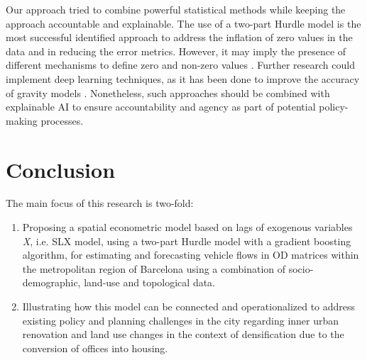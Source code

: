 Our approach tried to combine powerful statistical methods while keeping the approach accountable and explainable. 
The use of a two-part Hurdle model is the most successful identified approach to address the inflation of zero values in the data and in reducing the error metrics. However, it may imply the presence of different mechanisms to define zero and non-zero values \citep{Cameron2013RegressionData}. 
Further research could implement deep learning techniques, as it has been done to improve the accuracy of gravity models \citep{Simini2021AGeneration}. Nonetheless, such approaches should be combined with explainable AI to ensure accountability and agency as part of potential policy-making processes. 

\section{Conclusion}
\label{sec:ETRCO2H_conclusion}

The main focus of this research is two-fold: 
\begin{enumerate}
    \item Proposing a spatial econometric model based on lags of exogenous variables \emph{X}, i.e. SLX model, using a two-part Hurdle model with a gradient boosting algorithm, for estimating and forecasting vehicle flows in OD matrices within the metropolitan region of Barcelona using a combination of socio-demographic, land-use and topological data.
    \item Illustrating how this model can be connected and operationalized to address existing policy and planning challenges in the city regarding inner urban renovation and land use changes in the context of densification due to the conversion of offices into housing.
\end{enumerate}

